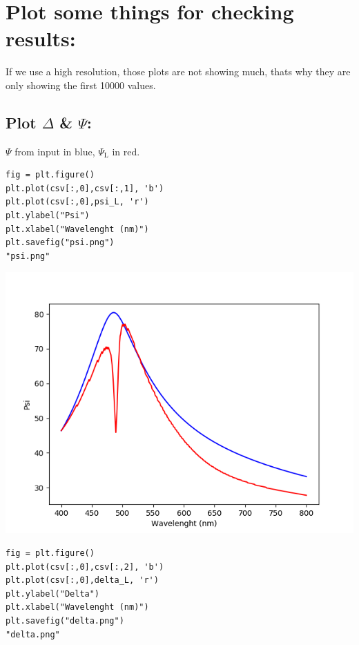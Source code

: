 \documentclass[11pt]{article}
\begin{document}
\section{Plot some things for checking results:}
\label{sec:org9199e77}

If we use a high resolution, those plots are not showing much, thats why they are only showing the first 10000 values.
\subsection{Plot \(\Delta\) \& \(\Psi\):}
\label{sec:orgea5e904}

\(\Psi\) from input in blue, \(\Psi_{\text{L}}\) in red.
\begin{verbatim}
fig = plt.figure()
plt.plot(csv[:,0],csv[:,1], 'b')
plt.plot(csv[:,0],psi_L, 'r')
plt.ylabel("Psi")
plt.xlabel("Wavelenght (nm)")
plt.savefig("psi.png")
"psi.png"
\end{verbatim}

\begin{center}
\includegraphics[width=.9\linewidth]{psi.png}
\end{center}

\begin{verbatim}
fig = plt.figure()
plt.plot(csv[:,0],csv[:,2], 'b')
plt.plot(csv[:,0],delta_L, 'r')
plt.ylabel("Delta")
plt.xlabel("Wavelenght (nm)")
plt.savefig("delta.png")
"delta.png"
\end{verbatim}
\end{document}
